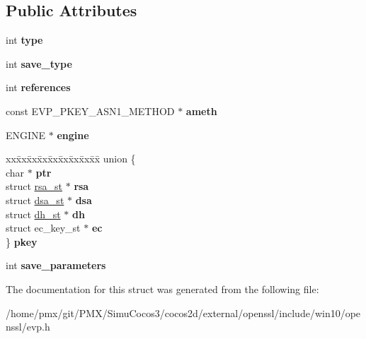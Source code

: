 \subsection*{Public Attributes}
\begin{DoxyCompactItemize}
\item 
\mbox{\label{structevp__pkey__st_a7d550d554ff45db26681e2d2e2f23b66}} 
int {\bfseries type}
\item 
\mbox{\label{structevp__pkey__st_a0bbebdbdbba1e1f9c796c1e4a3a2eb04}} 
int {\bfseries save\+\_\+type}
\item 
\mbox{\label{structevp__pkey__st_a89b11b788ffad7d747d1c7eed4cf279f}} 
int {\bfseries references}
\item 
\mbox{\label{structevp__pkey__st_a89d9cab6071d889719126a8ebc03b673}} 
const E\+V\+P\+\_\+\+P\+K\+E\+Y\+\_\+\+A\+S\+N1\+\_\+\+M\+E\+T\+H\+OD $\ast$ {\bfseries ameth}
\item 
\mbox{\label{structevp__pkey__st_a1fa3baf8af4a6f09233be9db77623e30}} 
E\+N\+G\+I\+NE $\ast$ {\bfseries engine}
\item 
\mbox{\label{structevp__pkey__st_ad39fa131b6ec956be56bbaa57306938e}} 
\begin{tabbing}
xx\=xx\=xx\=xx\=xx\=xx\=xx\=xx\=xx\=\kill
union \{\\
\>char $\ast$ {\bfseries ptr}\\
\>struct \hyperlink{structrsa__st}{rsa\_st} $\ast$ {\bfseries rsa}\\
\>struct \hyperlink{structdsa__st}{dsa\_st} $\ast$ {\bfseries dsa}\\
\>struct \hyperlink{structdh__st}{dh\_st} $\ast$ {\bfseries dh}\\
\>struct ec\_key\_st $\ast$ {\bfseries ec}\\
\} {\bfseries pkey}\\

\end{tabbing}\item 
\mbox{\label{structevp__pkey__st_a5ce6533b78cc5e5814a60ca2403c3108}} 
int {\bfseries save\+\_\+parameters}
\end{DoxyCompactItemize}


The documentation for this struct was generated from the following file\+:\begin{DoxyCompactItemize}
\item 
/home/pmx/git/\+P\+M\+X/\+Simu\+Cocos3/cocos2d/external/openssl/include/win10/openssl/evp.\+h\end{DoxyCompactItemize}
